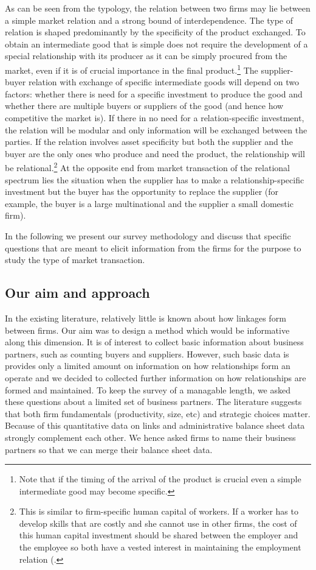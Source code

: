 \documentclass[final, dvipsnames, authoryear,12pt]{elsarticle}
\begin{document}
As can be seen from the typology, the relation between two firms may lie between a simple market relation and a strong bound of interdependence. The type of relation is shaped predominantly by the specificity of the product exchanged. To obtain an intermediate good that is simple does not require the development of a special relationship with its producer as it can be simply procured from the market, even if it is of crucial importance in the final product.\footnote{Note that if the timing of the arrival of the product is crucial even a simple intermediate good may become specific.} The supplier-buyer relation with exchange of specific intermediate goods will depend on two factors: whether there is need for a specific investment to produce the good and whether there are multiple buyers or suppliers of the good (and hence how competitive the market is). If there in no need for a relation-specific investment, the relation will be modular and only information will be exchanged between the parties. If the relation involves asset specificity but both the supplier and the buyer are the only ones who produce and need the product, the relationship will be relational.\footnote{This is similar to firm-specific human capital of workers. If a worker has to develop skills that are costly and she cannot use in other firms, the cost of this human capital investment should be shared between the employer and the employee so both have a vested interest in maintaining the employment relation (\cite{becker1962investment}.} At the opposite end from market transaction of the relational spectrum lies the situation when the supplier has to make a relationship-specific investment but the buyer has the opportunity to replace the supplier (for example, the buyer is a large multinational and the supplier a small domestic firm).  
    
In the following we present our survey methodology and discuss that specific questions that are meant to elicit information from the firms for the purpose to study the type of market transaction.
  
\subsection{Our aim and approach}

In the existing literature, relatively little is known about how linkages form between firms. Our aim was to design a method which would be informative along this dimension. It is of interest to collect basic information about business partners, such as counting buyers and suppliers. However, such basic data is provides only a limited amount on information on how relationships form an operate and we decided to collected further information on how relationships are formed and maintained. To keep the survey of a managable length, we asked these questions about a limited set of business partners. The literature suggests that both firm fundamentals (productivity, size, etc) and strategic choices matter. Because of this quantitative data on links and administrative balance sheet data strongly complement each other. We hence asked firms to name their business partners so that we can merge their balance sheet data.
\end{document}
